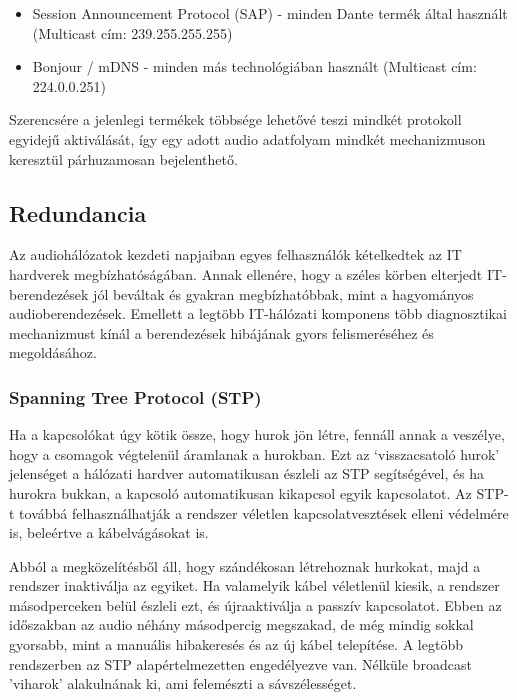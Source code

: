 \begin{itemize}
	\item Session Announcement Protocol (SAP) - minden Dante termék által használt (Multicast cím: 239.255.255.255)
\end{itemize}

\begin{itemize}
	\item Bonjour / mDNS - minden más technológiában használt (Multicast cím: 224.0.0.251) 
\end{itemize}
Szerencsére a jelenlegi termékek többsége
lehetővé teszi mindkét protokoll egyidejű aktiválását, így egy adott audio
adatfolyam mindkét mechanizmuson keresztül párhuzamosan bejelenthető.

\subsection{Redundancia}
Az audiohálózatok kezdeti napjaiban egyes felhasználók kételkedtek az IT
hardverek megbízhatóságában. Annak ellenére, hogy a széles körben elterjedt
IT-berendezések jól beváltak és gyakran megbízhatóbbak, mint a hagyományos
audioberendezések. Emellett a legtöbb IT-hálózati komponens több diagnosztikai
mechanizmust kínál a berendezések hibájának gyors felismeréséhez és megoldásához.

\subsubsection{Spanning Tree Protocol (STP)}
Ha a kapcsolókat úgy kötik össze, hogy hurok jön létre, fennáll annak a veszélye, 
hogy a csomagok végtelenül áramlanak a hurokban. 
Ezt az `visszacsatoló hurok' jelenséget a hálózati hardver automatikusan észleli az
STP segítségével, és ha hurokra bukkan, a kapcsoló automatikusan kikapcsol egyik
kapcsolatot. Az STP-t továbbá felhasználhatják a rendszer véletlen
kapcsolatvesztések elleni védelmére is, beleértve a kábelvágásokat is. 

Abból a  megközelítésből áll, hogy szándékosan létrehoznak hurkokat, majd a rendszer
inaktiválja az egyiket. Ha valamelyik kábel véletlenül kiesik, a rendszer
másodperceken belül észleli ezt, és újraaktiválja a passzív kapcsolatot. Ebben
az időszakban az audio néhány másodpercig megszakad, de még mindig sokkal
gyorsabb, mint a manuális hibakeresés és az új kábel telepítése. 
A legtöbb rendszerben az STP alapértelmezetten engedélyezve van. 
Nélküle broadcast 'viharok' alakulnának ki, ami felemészti a sávszélességet.

